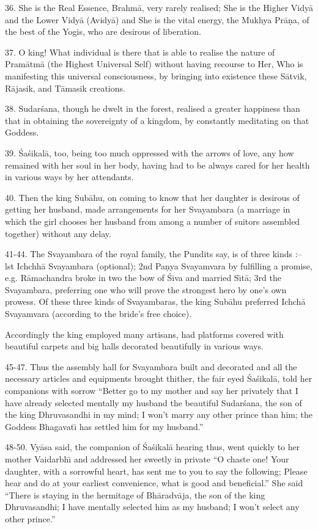 36. She is the Real Essence, Brahm\=a, very rarely realised; She is the Higher Vidy\=a and the Lower Vidy\=a (Avidy\=a) and She is the vital energy, the Mukhya Pr\=a\d{n}a, of the best of the Yogis, who are desirous of liberation.

37. O king! What individual is there that is able to realise the nature of Pram\=atm\=a (the Highest Universal Self) without having recourse to Her, Who is manifesting this universal consciousness, by bringing into existence these S\=atvik, R\=ajasik, and T\=amasik creations.

38. Sudar\'sana, though he dwelt in the forest, realised a greater happiness than that in obtaining the sovereignty of a kingdom, by constantly meditating on that Goddess.

39. \'Sa\'sikal\=a, too, being too much oppressed with the arrows of love, any how remained with her soul in her body, having had to be always cared for her health in various ways by her attendants.

40. Then the king Sub\=ahu, on coming to know that her daughter is desirous of getting her husband, made arrangements for her Svayambara (a marriage in which the girl chooses her husband from among a number of suitors assembled together) without any delay.

41-44. The Svayambara of the royal family, the Pundits say, is of three kinds :-- lst Ichchh\=a Svayambara (optional); 2nd Pa\d{n}ya Svayamvara by fulfilling a promise, e.g. R\=amachandra broke in two the bow of \'Siva and married S\={\i}t\=a; 3rd the Svayambara, preferring one who will prove the strongest hero by one's own prowess. Of these three kinds of Svayambaras, the king Sub\=ahu preferred Ichch\=a Svayamvara (according to the bride's free choice).

Accordingly the king employed many artisans, had platforms covered with beautiful carpets and big halls decorated beautifully in various ways.

45-47. Thus the assembly hall for Svayambara built and decorated and all the necessary articles and equipments brought thither, the fair eyed \'Sa\'sikal\=a, told her companions with sorrow ``Better go to my mother and say her privately that I have already selected mentally my husband the beautiful Sudar\'sana, the son of the king Dhruvasandhi in my mind; I won't marry any other prince than him; the Goddess Bhagavat\={\i} has settled him for my husband.''

48-50. Vy\=asa said, the companion of \'Sa\'sikal\=a hearing thus, went quickly to her mother Vaidarbh\={\i} and addressed her sweetly in private ``O chaste one! Your daughter, with a sorrowful heart, has sent me to you to say the following; Please hear and do at your earliest convenience, what is good and beneficial.'' She said ``There is staying in the hermitage of Bh\=aradv\=aja, the son of the king Dhruvasandhi; I have mentally selected him as my husband; I won't select any other prince.''

